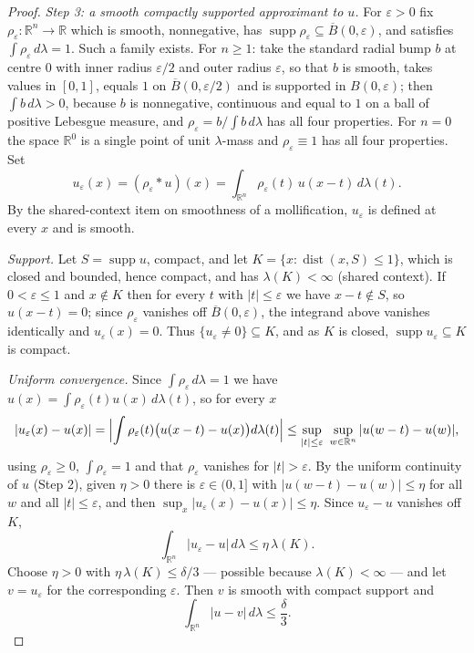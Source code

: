 \begin{proof}
\emph{Step 3: a smooth compactly supported approximant to $u$.}
For $\varepsilon > 0$ fix $\rho_\varepsilon : \mathbb{R}^n \to \mathbb{R}$ which
is smooth, nonnegative, has $\operatorname{supp}\rho_\varepsilon \subseteq
\overline B(0,\varepsilon)$, and satisfies $\int\rho_\varepsilon\,d\lambda = 1$.
Such a family exists.  For $n \geq 1$: take the standard radial bump $b$ at
centre $0$ with inner radius $\varepsilon/2$ and outer radius $\varepsilon$, so
that $b$ is smooth, takes values in $[0,1]$, equals $1$ on
$\overline B(0,\varepsilon/2)$ and is supported in $B(0,\varepsilon)$; then
$\int b\,d\lambda > 0$, because $b$ is nonnegative, continuous and equal to $1$
on a ball of positive Lebesgue measure, and $\rho_\varepsilon = b/\int b\,d\lambda$
has all four properties.  For $n = 0$ the space $\mathbb{R}^0$ is a single point
of unit $\lambda$-mass and $\rho_\varepsilon \equiv 1$ has all four properties.  Set
\[
  u_\varepsilon(x) = (\rho_\varepsilon * u)(x)
    = \int_{\mathbb{R}^n}\rho_\varepsilon(t)\,u(x-t)\,d\lambda(t) .
\]
By the shared-context item on smoothness of a mollification, $u_\varepsilon$ is
defined at every $x$ and is smooth.

\emph{Support.}  Let $S = \operatorname{supp}u$, compact, and let
$K = \{x : \operatorname{dist}(x,S) \leq 1\}$, which is closed and bounded,
hence compact, and has $\lambda(K) < \infty$ (shared context).  If
$0 < \varepsilon \leq 1$ and $x \notin K$ then for every $t$ with
$|t| \leq \varepsilon$ we have $x - t \notin S$, so $u(x-t) = 0$; since
$\rho_\varepsilon$ vanishes off $\overline B(0,\varepsilon)$, the integrand
above vanishes identically and $u_\varepsilon(x) = 0$.  Thus
$\{u_\varepsilon \neq 0\} \subseteq K$, and as $K$ is closed,
$\operatorname{supp}u_\varepsilon \subseteq K$ is compact.

\emph{Uniform convergence.}  Since $\int\rho_\varepsilon\,d\lambda = 1$ we have
$u(x) = \int\rho_\varepsilon(t)u(x)\,d\lambda(t)$, so for every $x$
\[
  |u_\varepsilon(x) - u(x)|
    = \Bigl|\int\rho_\varepsilon(t)\bigl(u(x-t)-u(x)\bigr)d\lambda(t)\Bigr|
    \leq \sup_{|t|\leq\varepsilon}\ \sup_{w\in\mathbb{R}^n}|u(w-t)-u(w)| ,
\]
using $\rho_\varepsilon \geq 0$, $\int\rho_\varepsilon = 1$ and that
$\rho_\varepsilon$ vanishes for $|t| > \varepsilon$.  By the uniform continuity
of $u$ (Step 2), given $\eta > 0$ there is $\varepsilon \in (0,1]$ with
$|u(w-t)-u(w)| \leq \eta$ for all $w$ and all $|t| \leq \varepsilon$, and then
$\sup_x|u_\varepsilon(x)-u(x)| \leq \eta$.  Since $u_\varepsilon - u$ vanishes
off $K$,
\[
  \int_{\mathbb{R}^n}|u_\varepsilon - u|\,d\lambda \leq \eta\,\lambda(K) .
\]
Choose $\eta > 0$ with $\eta\,\lambda(K) \leq \delta/3$ --- possible because
$\lambda(K) < \infty$ --- and let $v = u_\varepsilon$ for the corresponding
$\varepsilon$.  Then $v$ is smooth with compact support and
\begin{equation*}
  \int_{\mathbb{R}^n}|u - v|\,d\lambda \leq \frac{\delta}{3} . \tag{3}
\end{equation*}


\end{proof}
